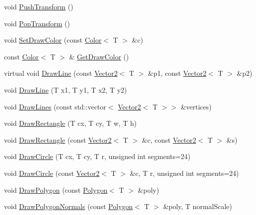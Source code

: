 \begin{DoxyCompactItemize}
\item 
void \hyperlink{classastu_1_1suite2d_1_1LineRendererClient_af8761439ae1a93bfe3c11d298e356182}{Push\+Transform} ()
\item 
void \hyperlink{classastu_1_1suite2d_1_1LineRendererClient_ade57ff3efe68be03d83203890e4aa64a}{Pop\+Transform} ()
\item 
void \hyperlink{classastu_1_1suite2d_1_1LineRendererClient_af1cd4a97304108a78db34861f8d40c2a}{Set\+Draw\+Color} (const \hyperlink{classastu_1_1Color}{Color}$<$ T $>$ \&c)
\item 
const \hyperlink{classastu_1_1Color}{Color}$<$ T $>$ \& \hyperlink{classastu_1_1suite2d_1_1LineRendererClient_a68715addd34ead52f809c8eb6b555442}{Get\+Draw\+Color} ()
\item 
virtual void \hyperlink{classastu_1_1suite2d_1_1LineRendererClient_aec1c6210cceed2997951390e16ffb574}{Draw\+Line} (const \hyperlink{classastu_1_1Vector2}{Vector2}$<$ T $>$ \&p1, const \hyperlink{classastu_1_1Vector2}{Vector2}$<$ T $>$ \&p2)
\item 
void \hyperlink{classastu_1_1suite2d_1_1LineRendererClient_a82d60fdaacacc9fff598193537df1dd8}{Draw\+Line} (T x1, T y1, T x2, T y2)
\item 
void \hyperlink{classastu_1_1suite2d_1_1LineRendererClient_aa4753afaef212ae29751ea9b82f3147b}{Draw\+Lines} (const std\+::vector$<$ \hyperlink{classastu_1_1Vector2}{Vector2}$<$ T $>$$>$ \&vertices)
\item 
void \hyperlink{classastu_1_1suite2d_1_1LineRendererClient_a092fe14fdfebc4270fa0784018fa03d1}{Draw\+Rectangle} (T cx, T cy, T w, T h)
\item 
void \hyperlink{classastu_1_1suite2d_1_1LineRendererClient_a80c9ecfc19f5496531d0aee3bb19f645}{Draw\+Rectangle} (const \hyperlink{classastu_1_1Vector2}{Vector2}$<$ T $>$ \&c, const \hyperlink{classastu_1_1Vector2}{Vector2}$<$ T $>$ \&s)
\item 
void \hyperlink{classastu_1_1suite2d_1_1LineRendererClient_a228f44ab66118de486978a467608e82e}{Draw\+Circle} (T cx, T cy, T r, unsigned int segments=24)
\item 
void \hyperlink{classastu_1_1suite2d_1_1LineRendererClient_a6a195d17c31ba5d209cc3041aa9e9e3c}{Draw\+Circle} (const \hyperlink{classastu_1_1Vector2}{Vector2}$<$ T $>$ \&c, T r, unsigned int segments=24)
\item 
void \hyperlink{classastu_1_1suite2d_1_1LineRendererClient_ac8cfa3e2e94d0bb5e787191146f043ed}{Draw\+Polygon} (const \hyperlink{classastu_1_1Polygon}{Polygon}$<$ T $>$ \&poly)
\item 
void \hyperlink{classastu_1_1suite2d_1_1LineRendererClient_af90e47acfd9aff3137395120e12ad77f}{Draw\+Polygon\+Normals} (const \hyperlink{classastu_1_1Polygon}{Polygon}$<$ T $>$ \&poly, T normal\+Scale)
\end{DoxyCompactItemize}
